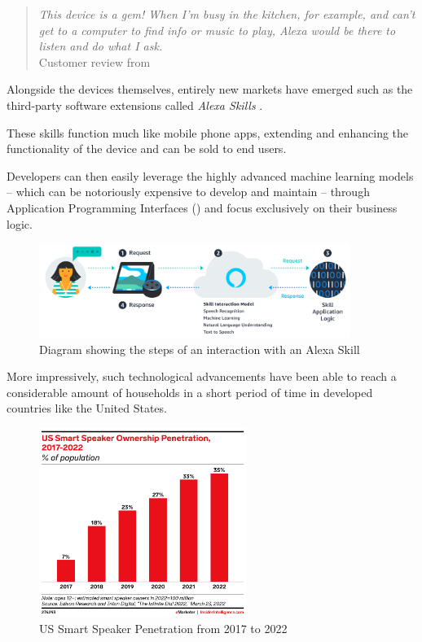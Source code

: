 \documentclass[openright]{normas-utf-tex} %
\begin{document}
\begin{quote}
    \textit{This device is a gem! When I’m busy in the kitchen, for example, and can’t get
    to a computer to find info or music to play, Alexa would be there to listen
    and do what I ask.} \\
    Customer review from \cite{GaoPanWangChen2018}
\end{quote}

Alongside the devices themselves, entirely new markets have emerged such as the
third-party software extensions called \textit{Alexa Skills} \cite{Alexa2022}.

These skills function much like mobile phone apps, extending and enhancing the
functionality of the device and can be sold to end users.

Developers can then easily leverage the highly advanced machine learning models
-- which can be notoriously expensive to develop and maintain \cite{Phdata2021}
-- through Application Programming Interfaces () and focus exclusively on their business logic.

\begin{figure}[htb!]
	\centering
	\includegraphics[width=0.9\textwidth]{./images/skills.png} %
	\caption[Diagram showing the steps of an interaction with an Alexa Skill]{Diagram showing the steps of an interaction with an Alexa Skill}
	\label{fig:alexaskill}
\end{figure}

More impressively, such technological advancements have been able to reach a
considerable amount of households in a short period of time in developed
countries like the United States. 

\begin{figure}[H]
	\centering
	\includegraphics[width=0.6\textwidth]{./images/smartspeaker.png} %
	\caption[US Smart Speaker Penetration from 2017 to 2022]{US Smart Speaker Penetration from 2017 to 2022}
	\label{fig:smartspeaker}
\end{figure}
\end{document}
